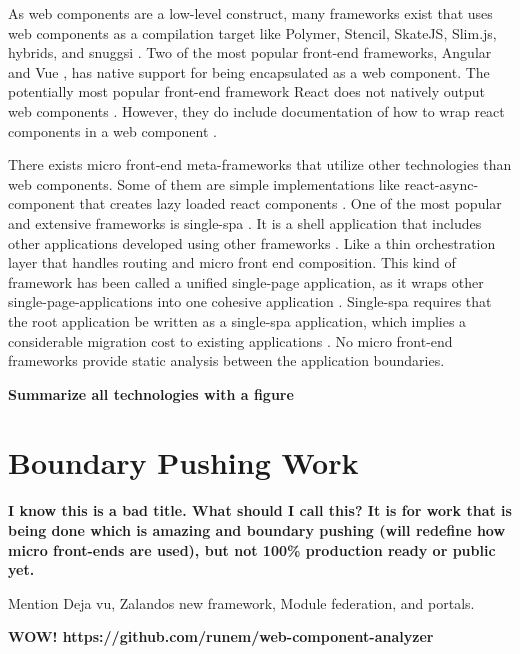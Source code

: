 As web components are a low-level construct, many frameworks exist that uses web components as a compilation target like Polymer, Stencil, SkateJS, Slim.js, hybrids, and snuggsi \cite{WebComponents.orgb}. Two of the most popular front-end frameworks, Angular \cite{Googlec} and Vue \cite{Vuejs}, has native support for being encapsulated as a web component. The potentially most popular front-end framework React does not natively output web components \cite{Dodson}. However, they do include documentation of how to wrap react components in a web component \cite{FacebookInc.}.

There exists micro front-end meta-frameworks that utilize other technologies than web components. Some of them are simple implementations like react-async-component that creates lazy loaded react components \cite{Matheson}. One of the most popular and extensive frameworks is single-spa \cite{Single-spa}. It is a shell application that includes other applications developed using other frameworks \cite{Single-spa}. Like a thin orchestration layer that handles routing and micro front end composition. This kind of framework has been called a unified single-page application, as it wraps other single-page-applications into one cohesive application \cite{Geers2020}. Single-spa requires that the root application be written as a single-spa application, which implies a considerable migration cost to existing applications \cite{Single-spa}. No micro front-end frameworks provide static analysis between the application boundaries.

\textbf{Summarize all technologies with a figure}

\section{Boundary Pushing Work}

\textbf{I know this is a bad title. What should I call this? It is for work that is being done which is amazing and boundary pushing (will redefine how micro front-ends are used), but not 100\% production ready or public yet.}

Mention Deja vu, Zalandos new framework, Module federation, and portals.

\textbf{WOW! https://github.com/runem/web-component-analyzer}